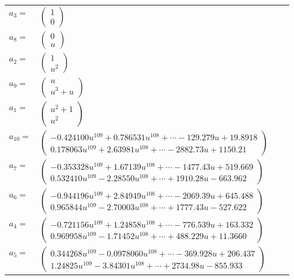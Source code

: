\documentclass[1p]{elsarticle_modified}
\theoremstyle{definition}
\begin{document}
\begin{tabular}{m{7pt} m{180pt} m{7pt} m{180pt} }
\flushright $a_{3}=$&$\begin{pmatrix}1\\0\end{pmatrix}$ \\
\flushright $a_{8}=$&$\begin{pmatrix}0\\u\end{pmatrix}$ \\
\flushright $a_{2}=$&$\begin{pmatrix}1\\u^2\end{pmatrix}$ \\
\flushright $a_{9}=$&$\begin{pmatrix}u\\u^3+u\end{pmatrix}$ \\
\flushright $a_{1}=$&$\begin{pmatrix}u^2+1\\u^2\end{pmatrix}$ \\
\flushright $a_{10}=$&$\begin{pmatrix}-0.424100 u^{109}+0.786531 u^{108}+\cdots-129.279 u+19.8918\\0.178063 u^{109}+2.63981 u^{108}+\cdots-2882.73 u+1150.21\end{pmatrix}$ \\
\flushright $a_{7}=$&$\begin{pmatrix}-0.353328 u^{109}+1.67139 u^{108}+\cdots-1477.43 u+519.669\\0.532410 u^{109}-2.28550 u^{108}+\cdots+1910.28 u-663.962\end{pmatrix}$ \\
\flushright $a_{6}=$&$\begin{pmatrix}-0.944196 u^{109}+2.84949 u^{108}+\cdots-2069.39 u+645.488\\0.965844 u^{109}-2.70003 u^{108}+\cdots+1777.43 u-527.622\end{pmatrix}$ \\
\flushright $a_{4}=$&$\begin{pmatrix}-0.721156 u^{109}+1.24858 u^{108}+\cdots-776.539 u+163.332\\0.969958 u^{109}-1.71452 u^{108}+\cdots+488.229 u+11.3660\end{pmatrix}$ \\
\flushright $a_{5}=$&$\begin{pmatrix}0.344268 u^{109}-0.0978060 u^{108}+\cdots-369.928 u+206.437\\1.24825 u^{109}-3.84301 u^{108}+\cdots+2734.98 u-855.933\end{pmatrix}$ \\

\end{tabular}
\end{document}
